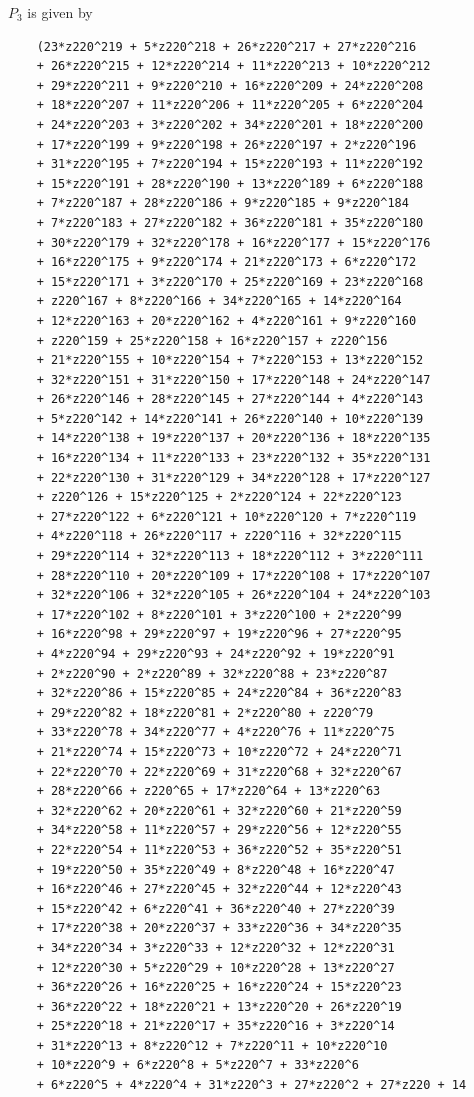 \documentclass{scrartcl}
\theoremstyle{definition}
\begin{document}
$P_3$ is given by
\begin{lstlisting}
    (23*z220^219 + 5*z220^218 + 26*z220^217 + 27*z220^216 
    + 26*z220^215 + 12*z220^214 + 11*z220^213 + 10*z220^212 
    + 29*z220^211 + 9*z220^210 + 16*z220^209 + 24*z220^208 
    + 18*z220^207 + 11*z220^206 + 11*z220^205 + 6*z220^204 
    + 24*z220^203 + 3*z220^202 + 34*z220^201 + 18*z220^200 
    + 17*z220^199 + 9*z220^198 + 26*z220^197 + 2*z220^196 
    + 31*z220^195 + 7*z220^194 + 15*z220^193 + 11*z220^192 
    + 15*z220^191 + 28*z220^190 + 13*z220^189 + 6*z220^188 
    + 7*z220^187 + 28*z220^186 + 9*z220^185 + 9*z220^184 
    + 7*z220^183 + 27*z220^182 + 36*z220^181 + 35*z220^180 
    + 30*z220^179 + 32*z220^178 + 16*z220^177 + 15*z220^176 
    + 16*z220^175 + 9*z220^174 + 21*z220^173 + 6*z220^172 
    + 15*z220^171 + 3*z220^170 + 25*z220^169 + 23*z220^168 
    + z220^167 + 8*z220^166 + 34*z220^165 + 14*z220^164 
    + 12*z220^163 + 20*z220^162 + 4*z220^161 + 9*z220^160 
    + z220^159 + 25*z220^158 + 16*z220^157 + z220^156 
    + 21*z220^155 + 10*z220^154 + 7*z220^153 + 13*z220^152 
    + 32*z220^151 + 31*z220^150 + 17*z220^148 + 24*z220^147 
    + 26*z220^146 + 28*z220^145 + 27*z220^144 + 4*z220^143 
    + 5*z220^142 + 14*z220^141 + 26*z220^140 + 10*z220^139 
    + 14*z220^138 + 19*z220^137 + 20*z220^136 + 18*z220^135 
    + 16*z220^134 + 11*z220^133 + 23*z220^132 + 35*z220^131 
    + 22*z220^130 + 31*z220^129 + 34*z220^128 + 17*z220^127 
    + z220^126 + 15*z220^125 + 2*z220^124 + 22*z220^123 
    + 27*z220^122 + 6*z220^121 + 10*z220^120 + 7*z220^119 
    + 4*z220^118 + 26*z220^117 + z220^116 + 32*z220^115 
    + 29*z220^114 + 32*z220^113 + 18*z220^112 + 3*z220^111 
    + 28*z220^110 + 20*z220^109 + 17*z220^108 + 17*z220^107 
    + 32*z220^106 + 32*z220^105 + 26*z220^104 + 24*z220^103 
    + 17*z220^102 + 8*z220^101 + 3*z220^100 + 2*z220^99 
    + 16*z220^98 + 29*z220^97 + 19*z220^96 + 27*z220^95 
    + 4*z220^94 + 29*z220^93 + 24*z220^92 + 19*z220^91 
    + 2*z220^90 + 2*z220^89 + 32*z220^88 + 23*z220^87 
    + 32*z220^86 + 15*z220^85 + 24*z220^84 + 36*z220^83 
    + 29*z220^82 + 18*z220^81 + 2*z220^80 + z220^79 
    + 33*z220^78 + 34*z220^77 + 4*z220^76 + 11*z220^75 
    + 21*z220^74 + 15*z220^73 + 10*z220^72 + 24*z220^71 
    + 22*z220^70 + 22*z220^69 + 31*z220^68 + 32*z220^67 
    + 28*z220^66 + z220^65 + 17*z220^64 + 13*z220^63 
    + 32*z220^62 + 20*z220^61 + 32*z220^60 + 21*z220^59 
    + 34*z220^58 + 11*z220^57 + 29*z220^56 + 12*z220^55 
    + 22*z220^54 + 11*z220^53 + 36*z220^52 + 35*z220^51 
    + 19*z220^50 + 35*z220^49 + 8*z220^48 + 16*z220^47 
    + 16*z220^46 + 27*z220^45 + 32*z220^44 + 12*z220^43 
    + 15*z220^42 + 6*z220^41 + 36*z220^40 + 27*z220^39 
    + 17*z220^38 + 20*z220^37 + 33*z220^36 + 34*z220^35 
    + 34*z220^34 + 3*z220^33 + 12*z220^32 + 12*z220^31 
    + 12*z220^30 + 5*z220^29 + 10*z220^28 + 13*z220^27 
    + 36*z220^26 + 16*z220^25 + 16*z220^24 + 15*z220^23 
    + 36*z220^22 + 18*z220^21 + 13*z220^20 + 26*z220^19 
    + 25*z220^18 + 21*z220^17 + 35*z220^16 + 3*z220^14 
    + 31*z220^13 + 8*z220^12 + 7*z220^11 + 10*z220^10 
    + 10*z220^9 + 6*z220^8 + 5*z220^7 + 33*z220^6 
    + 6*z220^5 + 4*z220^4 + 31*z220^3 + 27*z220^2 + 27*z220 + 14 
    

\end{lstlisting}
\end{document}
